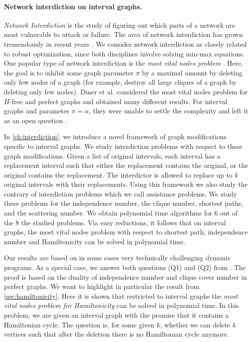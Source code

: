 \paragraph*{Network interdiction on interval graphs.}
\emph{Network Interdiction} \cite{NetworkInterdictProblemsBookChapter} is the study of figuring out which parts of a network are most vulnerable to attack or failure. The area of network interdiction has grown tremendously in recent years \cite{criticalNodeDetectionSurvey}. 
We consider network interdiction as closely related to robust optimization, since both disciplines involve solving min-max equations. One popular type of network interdiction is the \emph{most vital nodes problem}  \cite{baier2010length,complexityOfFindingMostVitalNodesShortestPath,mostVitalNodesWrtIndSet,mostVitalLinksNodes1982,mahdavi2014minimum}. Here, the goal is to inhibit some graph parameter $\pi$ by a maximal amount by deleting only few nodes of a graph (for example, destroy all large cliques of a graph by deleting only few nodes). Diner et al. \cite{diner2018contractionDeletionBlockers} considered the most vital nodes problem for $H$-free and perfect graphs and obtained many different results. For interval graphs and parameter $\pi = \alpha$, they were unable to settle the complexity and left it as an open question \cite[(Q2)]{diner2018contractionDeletionBlockers}.

In \cref{ch:interdiction}, we introduce a novel framework of graph modifications specific to interval graphs. We study interdiction problems with respect to these graph modifications. 
Given a list of original intervals, each interval has a replacement interval such that either the replacement contains the original, or the original contains the replacement. 
The interdictor is allowed to replace up to $k$ original intervals with their replacements. 
Using this framework we also study the contrary of interdiction problems which we call assistance problems. We study these problems for the independence number, the clique number, shortest paths, and the scattering number. 
We obtain polynomial time algorithms for 6 out of the 8 the studied problems. Via easy reductions, it follows that on interval graphs, the most vital nodes problem with respect to shortest path, independence number and Hamiltonicity can be solved in polynomial time.

Our results are based on in some cases very technically challenging dynamic programs. As a special case, we answer both questions (Q1) and (Q2) from \cite{diner2018contractionDeletionBlockers}. The proof is based on the duality of independence number and clique cover number in perfect graphs. We want to highlight in particular the result from \cref{sec:hamiltonicity}. 
Here it is shown that restricted to interval graphs the \emph{most vital nodes problem for Hamiltonicity} can be solved in polynomial time. 
In this problem, we are given an interval graph with the promise that it contains a Hamiltonian cycle. The question is, for some given $k$, whether we can delete $k$ vertices such that after the deletion there is no Hamiltonian cycle anymore. 

